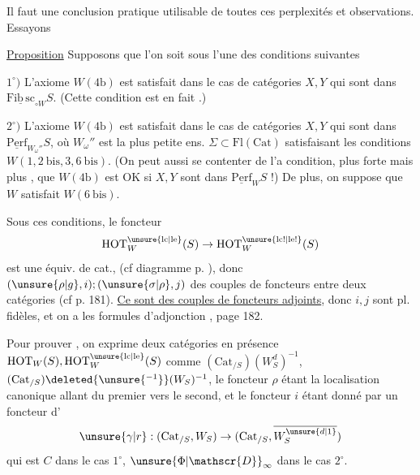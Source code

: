 Il faut une conclusion pratique utilisable de toutes ces perplexités et observations. Essayons

\uline{Proposition} Supposons que l'on soit sous l'une des conditions suivantes

$1^\circ)$ L'axiome $W(4\mathrm b)$ est satisfait dans le cas de catégories $X,Y$  qui sont dans $\underline{\mathrm{Fib\,sc}}_{\circ W}S$. (Cette condition  est en fait .)

$2^\circ)$ L'axiome $W(4\mathrm b)$ est satisfait dans le cas de catégories $X,Y$ qui sont dans $\underline{\mathrm{Perf}}_{W_\omega''}S$, où $W_\omega''$ est la plus petite ens. $\Sigma\subset\mathrm{Fl}(\mathrm{Cat})$ satisfaisant les conditions $W(1,2\ \mathrm{bis},3,6\ \mathrm{bis})$. (On peut aussi se contenter de l'a condition, plus forte mais plus , que $W(4\mathrm b)$ est OK si $X,Y$ sont dans $\underline{\mathrm{Perf}}_W S$ !) De plus, on suppose que $W$ satisfait $W(6\ \mathrm{bis})$.

Sous ces conditions, le foncteur 
\[
\mathrm{HOT}_W^{\unsure{\mathrm{lc}|\mathrm{le}}}(S)\to\mathrm{HOT}_W^{\unsure{\mathrm{lc}!|\mathrm{le}!}}(S)
\]
est une équiv. de cat., (cf diagramme p. ), donc $(\unsure{\rho|g},i);(\unsure{\sigma|\rho},j)$   des couples de foncteurs entre deux catégories (cf  p. 181). \uline{Ce sont des couples de foncteurs adjoints}, donc $i,j$ sont pl. fidèles, et on a les formules d'adjonction , page 182.

Pour  prouver  ,  on  exprime  deux catégories en présence $\mathrm{HOT}_W(S),\mathrm{HOT}_W^{\unsure{\mathrm{lc}|\mathrm{le}}}(S)$ comme $(\mathrm{Cat}_{/S})(W_S^d)^{-1}$, $(\mathrm{Cat}_{/S})\deleted{\unsure{^{-1}}}(W_S)^{-1}$, le foncteur $\rho$ étant la localisation canonique allant du premier vers le second, et le foncteur $i$ étant donné par un foncteur d'
\[
\unsure{\gamma|r}:(\mathrm{Cat}_{/S},W_S)\to(\mathrm{Cat}_{/S},\overline{W_S^{\unsure{d|1}}})
\]
qui est $C$ dans le cas $1^\circ$, $\unsure{\Phi|\mathscr{D}}_\infty$ dans le cas $2^\circ$.

